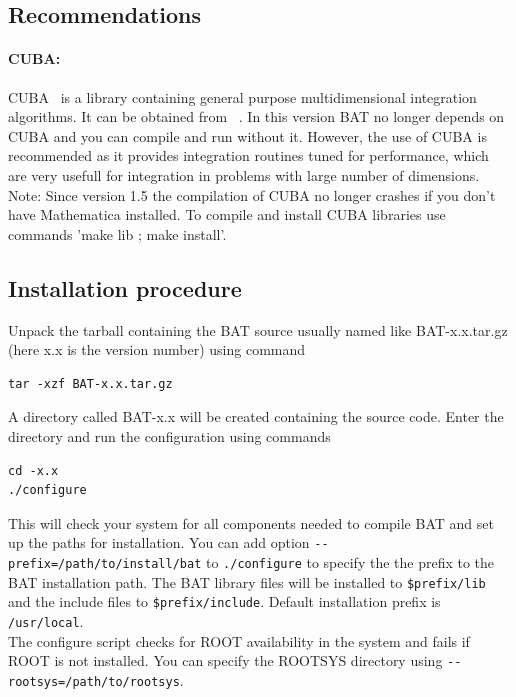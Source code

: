 \documentclass[11pt, a4paper]{article}
\begin{document}
\subsection{Recommendations}

\paragraph{CUBA:}
CUBA~\cite{CUBA} is a library containing general purpose
multidimensional integration algorithms. It can be obtained
from~\cite{CUBAweb} . In this version BAT no longer depends on CUBA
and you can compile and run without it. However, the use of CUBA is
recommended as it provides integration routines tuned for performance,
which are very usefull for integration in problems with large number
of dimensions. \\ 

Note: Since version 1.5 the compilation of CUBA no longer crashes if
you don't have Mathematica installed. To compile and install CUBA
libraries use commands 'make lib ; make install'.

\subsection{Installation procedure}

Unpack the tarball containing the BAT source usually named like
BAT-x.x.tar.gz (here x.x is the version number) using command
%
\begin{verbatim}
tar -xzf BAT-x.x.tar.gz
\end{verbatim}
%
A directory called BAT-x.x will be created containing the source code.
Enter the directory and run the configuration using commands
%
\begin{verbatim}
cd -x.x
./configure
\end{verbatim}

This will check your system for all components needed to compile BAT
and set up the paths for installation. You can add option
\verb|--prefix=/path/to/install/bat| to \verb|./configure| to specify
the the prefix to the BAT installation path. The BAT library files
will be installed to \verb|$prefix/lib| and the include files to
\verb|$prefix/include|. Default installation prefix is
\verb|/usr/local|. \\ 

The configure script checks for ROOT availability in the system and
fails if ROOT is not installed. You can specify the ROOTSYS directory
using \verb|--rootsys=/path/to/rootsys|. \\ 
\end{document}
